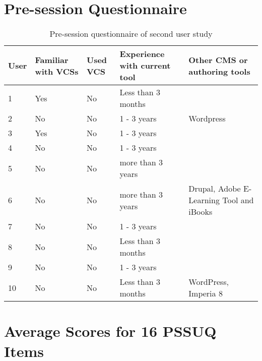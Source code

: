 
\section{Pre-session Questionnaire}

\begin{table}[h!]
\centering
\begin{tabular}{|l|p{3.5cm}|p{1.5cm}|p{3.5cm}|p{3.5cm}|}
\hline
\rowcolor[HTML]{EFEFEF}
\textbf{User} & \textbf{Familiar with VCSs} & \textbf{Used VCS} & \textbf{Experience with current tool} & \textbf{Other CMS or authoring tools} \\ \hline
1 & Yes & No & Less than 3 months &  \\ \hline
2 & No & No & 1 - 3 years & Wordpress \\ \hline
3 & Yes & No & 1 - 3 years &  \\ \hline
4 & No & No & 1 - 3 years &  \\ \hline
5 & No & No & more than 3 years &  \\ \hline
6 & No & No & more than 3 years & Drupal, Adobe E-Learning Tool and iBooks \\ \hline
7 & No & No & 1 - 3 years &  \\ \hline
8 & No & No & Less than 3 months &  \\ \hline
9 & No & No & 1 - 3 years &  \\ \hline
10 & No & No & Less than 3 months & WordPress, Imperia 8 \\ \hline
\end{tabular}
\caption{Pre-session questionnaire of second user study}
\label{table:pre-sess-quest-second}
\end{table}

\section{Average Scores for 16 PSSUQ Items} \label{appendix:pssuq}

